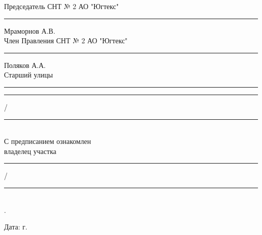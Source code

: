 \vspace{5mm}
\noindent Председатель СНТ № 2 АО "Югтекс" \hfill    \rule{40mm}{0.1 mm}    Мраморнов А.В.\\[3mm]
\noindent Член Правления СНТ № 2 АО "Югтекс" \hfill    \rule{46mm}{0.1 mm}    Поляков А.А.\\[3mm]
\noindent Старший улицы  \rule{6cm}{0.1 mm} \hfill    \rule{3cm}{0.1 mm}/\rule{4cm}{0.1 mm}\\

\noindent С предписанием ознакомлен\\
владелец участка    \hfill   \rule{3cm}{0.1 mm}/\rule{4cm}{0.1 mm}\\
.      \begin{flushright}
	Дата:   г.
\end{flushright}




